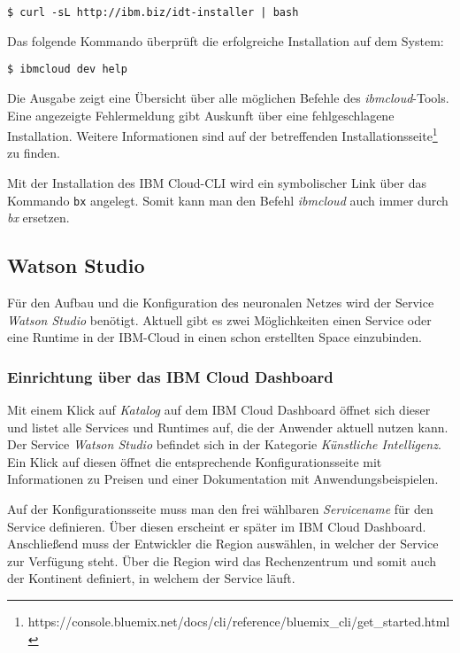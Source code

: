 \begin{lstlisting}[caption=Installation des IBM Cloud CLI, label=ls:vorbereitung_ibmcli]
    $ curl -sL http://ibm.biz/idt-installer | bash
\end{lstlisting}

Das folgende Kommando überprüft die erfolgreiche Installation auf dem System:

\begin{lstlisting}[caption=Installation des CLI überprüfen, label=ls:vorbereitung_ibmclitest]
    $ ibmcloud dev help
\end{lstlisting}

Die Ausgabe zeigt eine Übersicht über alle möglichen Befehle des \textit{ibmcloud}-Tools. Eine angezeigte Fehlermeldung
gibt Auskunft über eine fehlgeschlagene Installation. Weitere Informationen sind auf der betreffenden
Installationsseite\footnote{https://console.bluemix.net/docs/cli/reference/bluemix\_cli/get\_started.html} zu finden.

Mit der Installation des IBM Cloud-CLI wird ein symbolischer Link über das Kommando \texttt{bx} angelegt. Somit kann man
den Befehl \textit{ibmcloud} auch immer durch \textit{bx} ersetzen.

\subsection{Watson Studio}
Für den Aufbau und die Konfiguration des neuronalen Netzes wird der Service \textit{Watson Studio} benötigt. Aktuell gibt
es zwei Möglichkeiten einen Service oder eine Runtime in der IBM-Cloud in einen schon erstellten Space einzubinden.

\subsubsection{Einrichtung über das IBM Cloud Dashboard}
Mit einem Klick auf \textit{Katalog} auf dem IBM Cloud Dashboard öffnet sich dieser und listet alle Services und Runtimes
auf, die der Anwender aktuell nutzen kann. Der Service \textit{Watson Studio} befindet sich in der Kategorie
\textit{Künstliche Intelligenz}. Ein Klick auf diesen öffnet die entsprechende Konfigurationsseite mit Informationen zu
Preisen und einer Dokumentation mit Anwendungsbeispielen.

Auf der Konfigurationsseite muss man den frei wählbaren \textit{Servicename} für den Service definieren. Über diesen
erscheint er später im IBM Cloud Dashboard. Anschließend muss der Entwickler die Region auswählen, in welcher der Service
zur Verfügung steht. Über die Region wird das Rechenzentrum und somit auch der Kontinent definiert, in welchem der Service
läuft.

